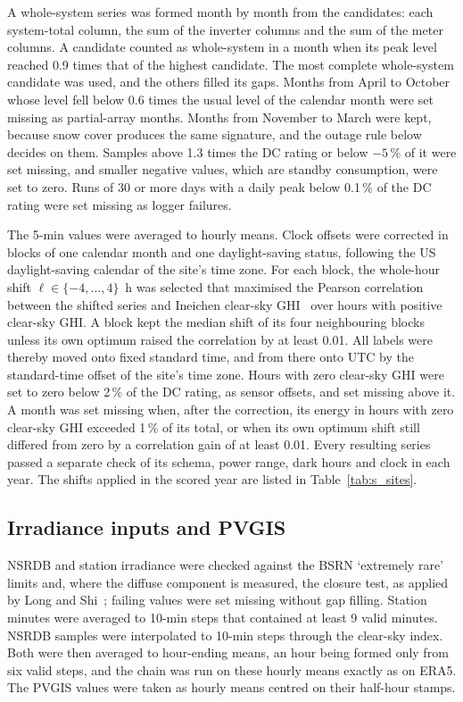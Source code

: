 \documentclass[11pt]{article}
\begin{document}
A whole-system series was formed month by month from the candidates: each system-total column, the sum of the inverter columns and the sum of the meter columns. A candidate counted as whole-system in a month when its peak level reached 0.9 times that of the highest candidate. The most complete whole-system candidate was used, and the others filled its gaps. Months from April to October whose level fell below 0.6 times the usual level of the calendar month were set missing as partial-array months. Months from November to March were kept, because snow cover produces the same signature, and the outage rule below decides on them. Samples above 1.3 times the DC rating or below $-5$\,\% of it were set missing, and smaller negative values, which are standby consumption, were set to zero. Runs of 30 or more days with a daily peak below 0.1\,\% of the DC rating were set missing as logger failures.

The 5-min values were averaged to hourly means. Clock offsets were corrected in blocks of one calendar month and one daylight-saving status, following the US daylight-saving calendar of the site's time zone. For each block, the whole-hour shift $\ell\in\{-4,\dots,4\}$~h was selected that maximised the Pearson correlation between the shifted series and Ineichen clear-sky GHI~\cite{ineichenPerez2002} over hours with positive clear-sky GHI. A block kept the median shift of its four neighbouring blocks unless its own optimum raised the correlation by at least 0.01. All labels were thereby moved onto fixed standard time, and from there onto UTC by the standard-time offset of the site's time zone. Hours with zero clear-sky GHI were set to zero below 2\,\% of the DC rating, as sensor offsets, and set missing above it. A month was set missing when, after the correction, its energy in hours with zero clear-sky GHI exceeded 1\,\% of its total, or when its own optimum shift still differed from zero by a correlation gain of at least 0.01. Every resulting series passed a separate check of its schema, power range, dark hours and clock in each year. The shifts applied in the scored year are listed in Table~\ref{tab:s_sites}.

\subsection{Irradiance inputs and PVGIS}
\label{sec:s_irr}

NSRDB and station irradiance were checked against the BSRN `extremely rare' limits and, where the diffuse component is measured, the closure test, as applied by Long and Shi~\cite{longShi2008qcrad}; failing values were set missing without gap filling. Station minutes were averaged to 10-min steps that contained at least 9 valid minutes. NSRDB samples were interpolated to 10-min steps through the clear-sky index. Both were then averaged to hour-ending means, an hour being formed only from six valid steps, and the chain was run on these hourly means exactly as on ERA5. The PVGIS values were taken as hourly means centred on their half-hour stamps.
\end{document}
